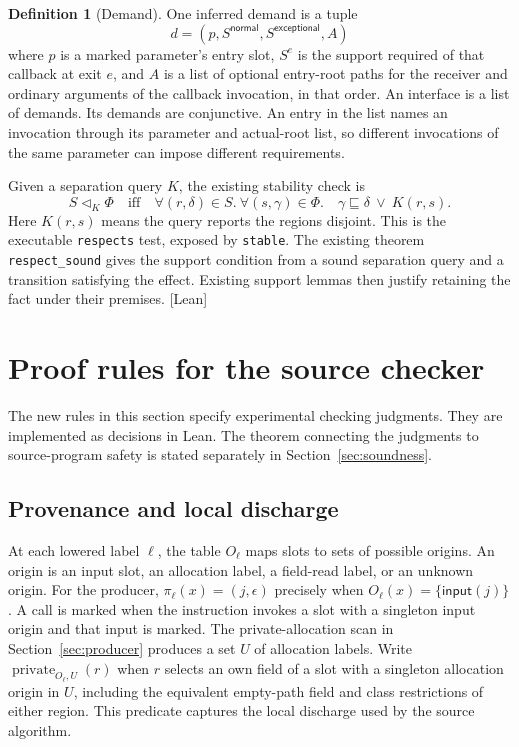 \documentclass[10pt,a4paper]{article}
\theoremstyle{definition}
\newtheorem{definition}{Definition}
\newcommand{\norm}{\mathsf{normal}}
\newcommand{\exc}{\mathsf{exceptional}}
\newcommand{\lean}[1]{\textcolor{leanc}{\texttt{\small #1}}}
\newcommand{\status}[1]{\textcolor{leanc}{\textsf{\small[#1]}}}
\newcommand{\respects}{\mathrel{\triangleleft}}
\newcommand{\priv}{\operatorname{private}}
\begin{document}
\begin{definition}[Demand]
One inferred demand is a tuple
\[
 d=(p,S^{\norm},S^{\exc},A)
\]
where $p$ is a marked parameter's entry slot, $S^e$ is the support
required of that callback at exit $e$, and $A$ is a list of optional
entry-root paths for the receiver and ordinary arguments of the
callback invocation, in that order. An interface is a list of
demands. Its demands are conjunctive. An entry in the list names
an invocation through its parameter and actual-root list, so
different invocations of the same parameter can impose different
requirements.
\end{definition}

Given a separation query $K$, the existing stability check is
\[
 S \respects_K \Phi
 \quad\text{iff}\quad
 \forall(r,\delta)\in S.\ \forall(s,\gamma)\in\Phi.\quad
     \gamma\sqsubseteq\delta\ \lor\ K(r,s).
\]
Here $K(r,s)$ means the query reports the regions disjoint. This
is the executable \lean{respects} test, exposed by \lean{stable}.
The existing theorem \lean{respect\_sound} gives the support
condition from a sound separation query and a transition satisfying
the effect. Existing support lemmas then justify retaining the fact
under their premises. \status{Lean}

\section{Proof rules for the source checker}\label{sec:rules}

The new rules in this section specify experimental checking
judgments. They are implemented as decisions in Lean. The theorem
connecting the judgments to source-program safety is
stated separately in Section~\ref{sec:soundness}.

\subsection{Provenance and local discharge}

At each lowered label $\ell$, the table $O_\ell$ maps slots to
sets of possible origins. An origin is an input slot, an allocation
label, a field-read label, or an unknown origin. For the producer,
$\pi_\ell(x)=(j,\epsilon)$ precisely when
$O_\ell(x)=\{\mathsf{input}(j)\}$. A call is marked when the
instruction invokes a slot with a singleton input origin and that
input is marked. The private-allocation scan in
Section~\ref{sec:producer} produces a set $U$ of allocation labels.
Write $\priv_{O_\ell,U}(r)$ when $r$ selects an own field of a slot
with a singleton allocation origin in $U$, including the equivalent
empty-path field and class restrictions of either region. This
predicate captures the local discharge used by the source algorithm.
\end{document}
